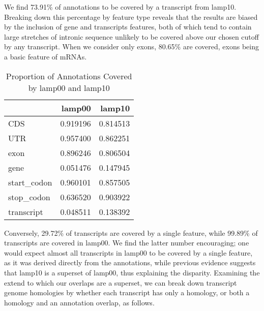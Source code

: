 \documentclass{article}
\begin{document}



We find 73.91\%
 of annotations to be covered by a transcript from lamp10. 
Breaking down this percentage by feature type reveals that the results are biased by the inclusion of gene and transcripts features, 
both of which tend to contain large stretches of intronic sequence unlikely to be covered above our chosen cutoff by any transcript. 
When we consider only exons, 80.65\%
 are covered, exons
being a basic feature of mRNAs.


\begin{table}[H]
\caption {Proportion of Annotations Covered by lamp00 and lamp10}
\begin{center}

\begin{tabular}{lrr}
\toprule
{} &    lamp00 &    lamp10 \\
\midrule
CDS         &  0.919196 &  0.814513 \\
UTR         &  0.957400 &  0.862251 \\
exon        &  0.896246 &  0.806504 \\
gene        &  0.051476 &  0.147945 \\
start\_codon &  0.960101 &  0.857505 \\
stop\_codon  &  0.636520 &  0.903922 \\
transcript  &  0.048511 &  0.138392 \\
\bottomrule
\end{tabular}



\end{center}
\end{table}

Conversely, 29.72\%
 of transcripts are covered by a single feature, while 99.89\%
 of 
transcripts are covered in lamp00. We find the latter number encouraging; one would expect almost all transcripts in lamp00 to be covered by a single feature, as it was derived directly from the annotations,
while previous evidence suggests that lamp10 is a superset of lamp00, thus explaining the disparity. Examining the extend to which our overlaps are a superset, we can break down transcript genome homologies by
whether each transcript has only a homology, or both a homology and an annotation overlap, as follows.
\end{document}
